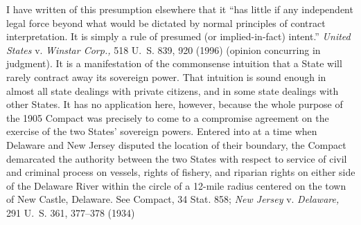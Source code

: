   I have written of this presumption elsewhere that it ``has little
if any independent legal force beyond what would be dictated by normal
principles of contract interpretation. It is simply a rule of presumed
(or implied-in-fact) intent.'' \emph{United States} v. \emph{Winstar
Corp.,} 518 U.~S. 839, 920 (1996) (opinion concurring in judgment).
It is a manifestation of the commonsense intuition that a State will
rarely contract away its sovereign power. That intuition is sound
enough in almost all state dealings with private citizens, and in some
state dealings with other States. It has no application here, however,
because the whole purpose of the 1905 Compact was precisely to come to
a compromise agreement on the exercise of the two States' sovereign
powers. Entered into at a time when Delaware and New Jersey disputed
the location of their boundary, the Compact demarcated the authority
between the two States with respect to service of civil and criminal
process on vessels, rights of fishery, and riparian rights on either
side of the Delaware River within the circle of a 12-mile radius
centered on the town of New Castle, Delaware. See Compact, 34 Stat.
858; \emph{New Jersey} v. \emph{Delaware,} 291 U.~S. 361, 377--378 (1934)
